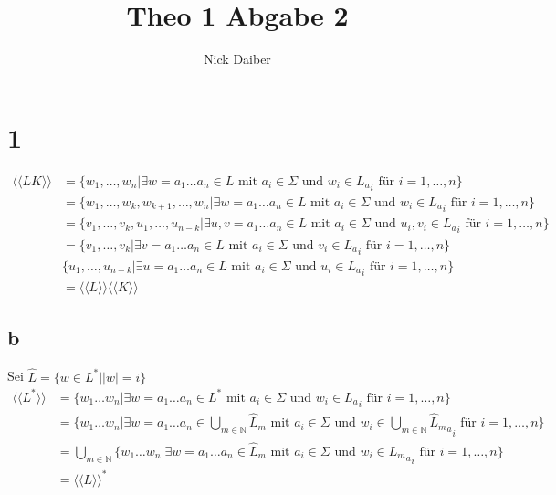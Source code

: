 \documentclass{article}
\title{Theo 1 Abgabe 2}
\author{Nick Daiber}
\newcommand{\llang}{\langle\langle}
\newcommand{\rrang}{\rangle\rangle}
\newcommand{\N}{\mathbb{N}}
\begin{document}
\maketitle
\section*{1}
\begin{align*}
    \llang LK\rrang &=
    \{w_1,\hdots,w_n|
    \exists w=a_1\hdots a_n\in L
    \text{ mit }a_i\in\Sigma
    \text{ und }w_i\in {L_a}_i
    \text{ für } i=1,\hdots,n\}\\
    &=\{w_1,\hdots,w_k,w_{k+1},\hdots,w_n|
    \exists w=a_1\hdots a_n\in L
    \text{ mit }a_i\in\Sigma
    \text{ und }w_i\in {L_a}_i
    \text{ für } i=1,\hdots,n\}\\
    &=\{v_1,\hdots,v_k,u_{1},\hdots,u_{n-k}|
    \exists u,v=a_1\hdots a_n\in L
    \text{ mit }a_i\in\Sigma
    \text{ und }u_i,v_i\in {L_a}_i
    \text{ für } i=1,\hdots,n\}\\
    &=
    \{v_1,\hdots,v_k|
    \exists v=a_1\hdots a_n\in L
    \text{ mit }a_i\in\Sigma
    \text{ und }v_i\in {L_a}_i
    \text{ für } i=1,\hdots,n\}\\
    &\{u_{1},\hdots,u_{n-k}|
    \exists u=a_1\hdots a_n\in L
    \text{ mit }a_i\in\Sigma
    \text{ und }u_i\in {L_a}_i
    \text{ für } i=1,\hdots,n\}\\
    &= \llang L \rrang \llang K \rrang
\end{align*}
\subsection*{b}
Sei $\hat{L} = \{w \in L^*| |w|=i\}$
\begin{align*}
    \llang L^* \rrang &= 
    \{w_1\hdots w_n |
    \exists w = a_1\hdots a_n \in L^*
    \text{ mit }a_i\in\Sigma
    \text{ und }w_i \in {L_a}_i
    \text{ für }i = 1,\hdots,n\}\\
    &=\{w_1\hdots w_n |
    \exists w = a_1\hdots a_n \in \underset{m\in\N}{\bigcup}\hat{L}_m
    \text{ mit }a_i\in\Sigma
    \text{ und }w_i \in {\underset{m\in\N}{\bigcup}{\hat{L}_m}_a}_i
    \text{ für }i = 1,\hdots,n\}\\
    &=
    \underset{m\in\N}{\bigcup} \{w_1\hdots w_n |
    \exists w = a_1\hdots a_n \in \hat{L}_m
    \text{ mit }a_i\in\Sigma
    \text{ und }w_i \in {{L_m}_a}_i
    \text{ für }i = 1,\hdots,n\}\\
    &=
    \llang L\rrang^*
\end{align*}
\end{document}
